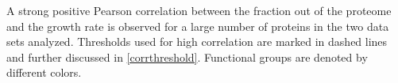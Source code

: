 \label{fig:growthcorr}
A strong positive Pearson correlation between the fraction out of the proteome and the growth rate is observed for a large number of proteins in the two data sets analyzed. Thresholds used for high correlation are marked in dashed lines and further discussed in \ref{corrthreshold}.
Functional groups are denoted by different colors.
